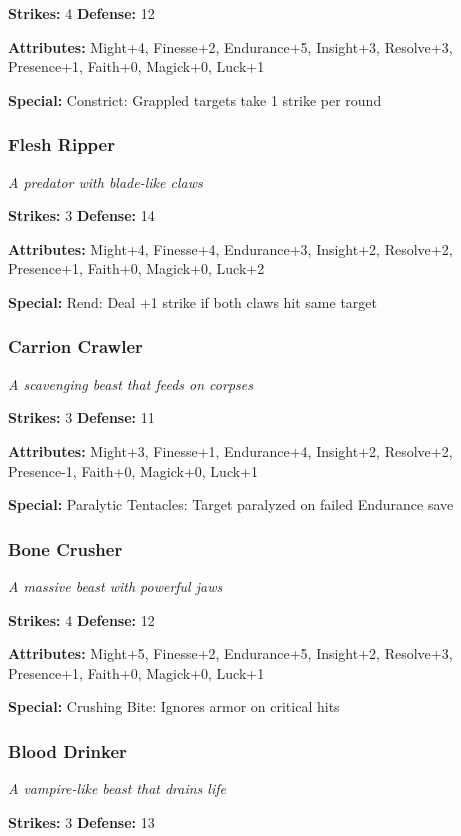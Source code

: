 \documentclass[10pt,twoside]{article}
\begin{document}
\textbf{Strikes:} 4 \quad \textbf{Defense:} 12

\textbf{Attributes:} Might+4, Finesse+2, Endurance+5, Insight+3, Resolve+3, Presence+1, Faith+0, Magick+0, Luck+1

\textbf{Special:} Constrict: Grappled targets take 1 strike per round

\subsubsection{Flesh Ripper}
\textit{A predator with blade-like claws}

\textbf{Strikes:} 3 \quad \textbf{Defense:} 14

\textbf{Attributes:} Might+4, Finesse+4, Endurance+3, Insight+2, Resolve+2, Presence+1, Faith+0, Magick+0, Luck+2

\textbf{Special:} Rend: Deal +1 strike if both claws hit same target

\subsubsection{Carrion Crawler}
\textit{A scavenging beast that feeds on corpses}

\textbf{Strikes:} 3 \quad \textbf{Defense:} 11

\textbf{Attributes:} Might+3, Finesse+1, Endurance+4, Insight+2, Resolve+2, Presence-1, Faith+0, Magick+0, Luck+1

\textbf{Special:} Paralytic Tentacles: Target paralyzed on failed Endurance save

\subsubsection{Bone Crusher}
\textit{A massive beast with powerful jaws}

\textbf{Strikes:} 4 \quad \textbf{Defense:} 12

\textbf{Attributes:} Might+5, Finesse+2, Endurance+5, Insight+2, Resolve+3, Presence+1, Faith+0, Magick+0, Luck+1

\textbf{Special:} Crushing Bite: Ignores armor on critical hits

\subsubsection{Blood Drinker}
\textit{A vampire-like beast that drains life}

\textbf{Strikes:} 3 \quad \textbf{Defense:} 13
\end{document}
